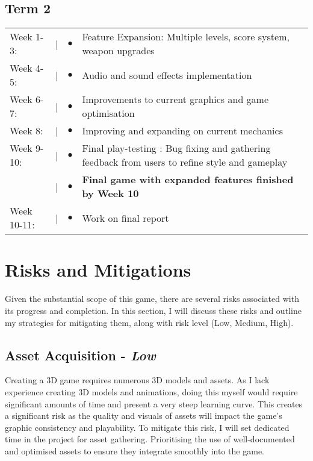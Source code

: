 \documentclass[12pt]{article}
\begin{document}
\subsection{Term 2}
\begin{tabular}{@{}p{2cm}@{}>{\raggedright\arraybackslash}p{0.5cm}@{}>{\raggedright\arraybackslash}p{0.5cm}@{}p{12cm}}
Week 1-3: & \textcolor{black}{|} & $\bullet$ & Feature Expansion: Multiple levels, score system, weapon upgrades\\
Week 4-5: & \textcolor{black}{|} & $\bullet$ & Audio and sound effects implementation \\
Week 6-7: & \textcolor{black}{|} & $\bullet$ &  Improvements to current graphics and game optimisation \\
Week 8: & \textcolor{black}{|} & $\bullet$ & Improving and expanding on current mechanics \\
Week 9-10: & \textcolor{black}{|} & $\bullet$ & Final play-testing : Bug fixing and gathering feedback from users to refine style and gameplay\\
& \textcolor{black}{|} & $\bullet$ & \textbf{Final game with expanded features finished by Week 10} \\
Week 10-11: & \textcolor{black}{|} & $\bullet$ & Work on final report \\
\end{tabular}


\section{Risks and Mitigations}
Given the substantial scope of this game, there are several risks associated with its progress and completion. In this section, I will discuss these risks and outline my strategies for mitigating them, along with risk level (Low, Medium, High).

\subsection{Asset Acquisition - \textit{Low}}
Creating a 3D game requires numerous 3D models and assets. As I lack experience creating 3D models and animations, doing this myself would require significant amounts of time and present a very steep learning curve. This creates a significant risk as the quality and visuals of assets will impact the game’s graphic consistency and playability. To mitigate this risk, I will set dedicated time in the project for asset gathering. Prioritising the use of well-documented and optimised assets to ensure they integrate smoothly into the game.
\end{document}
